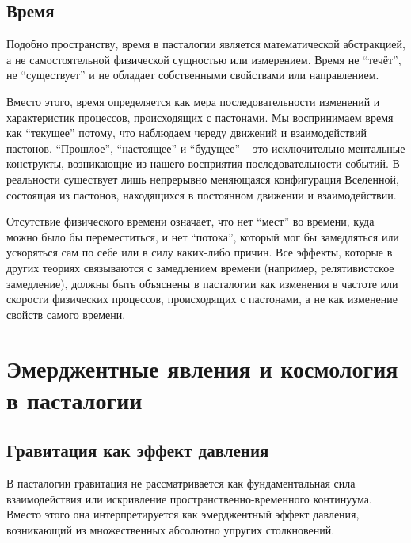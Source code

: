 \documentclass[pdflatex,sn-mathphys-num,referee]{sn-jnl}
\begin{document}
\subsection{Время}\label{subsec:time}

Подобно пространству, время в пасталогии является математической абстракцией, а не самостоятельной физической сущностью или измерением. Время не ``течёт'', не ``существует'' и не обладает собственными свойствами или направлением.

Вместо этого, время определяется как мера последовательности изменений и характеристик процессов, происходящих с пастонами. Мы воспринимаем время как ``текущее'' потому, что наблюдаем череду движений и взаимодействий пастонов. ``Прошлое'', ``настоящее'' и ``будущее'' -- это исключительно ментальные конструкты, возникающие из нашего восприятия последовательности событий. В реальности существует лишь непрерывно меняющаяся конфигурация Вселенной, состоящая из пастонов, находящихся в постоянном движении и взаимодействии.

Отсутствие физического времени означает, что нет ``мест'' во времени, куда можно было бы переместиться, и нет ``потока'', который мог бы замедляться или ускоряться сам по себе или в силу каких-либо причин. Все эффекты, которые в других теориях связываются с замедлением времени (например, релятивистское замедление), должны быть объяснены в пасталогии как изменения в частоте или скорости физических процессов, происходящих с пастонами, а не как изменение свойств самого времени.

\section{Эмерджентные явления и космология в пасталогии}\label{sec:emergent-cosmology}

\subsection{Гравитация как эффект давления}\label{subsec:gravity-pressure}

В пасталогии гравитация не рассматривается как фундаментальная сила взаимодействия или искривление пространственно-временного континуума. Вместо этого она интерпретируется как эмерджентный эффект давления, возникающий из множественных абсолютно упругих столкновений.
\end{document}

